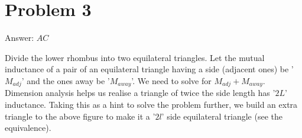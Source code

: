 \documentclass[11pt,a4paper]{scrartcl}
\begin{document}
\section{Problem 3}
\begin{solution}
Answer: $AC$

Divide the lower rhombus into two equilateral triangles. Let the mutual inductance of a pair of an equilateral triangle having a side (adjacent ones) be '$M_{adj}$' and the ones away be '$M_{away}$'. We need to solve for $M_{adj}+M_{away}$. Dimension analysis helps us realise a triangle of twice the side length has '$2L$' inductance. Taking this as a hint to solve the problem further, we build an extra triangle to the above figure to make it a '$2l$' side equilateral triangle (see the equivalence). \\
\begin{center}
    


\begin{tikzpicture}[x=0.75pt,y=0.75pt,yscale=-1,xscale=1]


\end{tikzpicture}
\end{center}
\end{solution}
\end{document}
